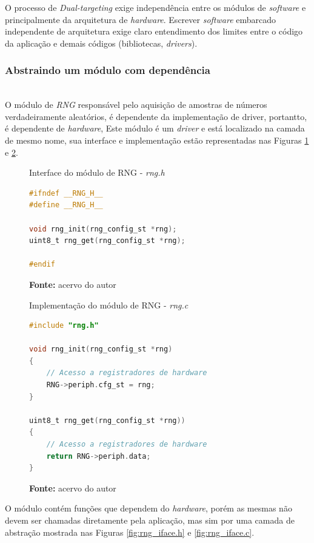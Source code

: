 \documentclass[times, twoside, watermark]{artigo}
\begin{document}
O processo de \textit{Dual-targeting} exige independência
entre os módulos de \textit{software} e principalmente da arquitetura de 
\textit{hardware}.
Escrever \textit{software} embarcado independente de arquitetura exige claro
entendimento dos limites entre o código da aplicação e demais códigos (bibliotecas, 
\textit{drivers}).

\subsubsection{Abstraindo um módulo com dependência}\hfill\\

O módulo de \textit{RNG} responsável pelo aquisição de amostras de números 
verdadeiramente aleatórios, é dependente da implementação de driver,
portantto, é dependente de \textit{hardware}, 
Este módulo é um \textit{driver} e está localizado na camada de mesmo nome, sua 
interface e implementação estão representadas
nas Figuras \ref{fig:rng.h} e \ref{fig:rng.c}.\hfill\

\begin{figure}[H]
  \centering
  \caption{Interface do módulo de RNG - \textit{rng.h}}
\begin{lstlisting}[language=C]
#ifndef __RNG_H__
#define __RNG_H__

void rng_init(rng_config_st *rng);
uint8_t rng_get(rng_config_st *rng);

#endif
\end{lstlisting}
  \label{fig:rng.h}
  \caption*{\newline\textbf{Fonte:} acervo do autor}
\end{figure}


\begin{figure}[H]
  \centering
  \caption{Implementação do módulo de RNG - \textit{rng.c}}
\begin{lstlisting}[language=C]
#include "rng.h"

void rng_init(rng_config_st *rng)
{
    // Acesso a registradores de hardware
    RNG->periph.cfg_st = rng;
}

uint8_t rng_get(rng_config_st *rng))
{
    // Acesso a registradores de hardware
    return RNG->periph.data;
}

\end{lstlisting}
  \label{fig:rng.c}
  \caption*{\newline\textbf{Fonte:} acervo do autor}
\end{figure}

O módulo contém funções que dependem do \textit{hardware}, porém as mesmas não
devem ser chamadas diretamente pela aplicação, mas sim por uma camada de abstração
mostrada nas Figuras \ref{fig:rng_iface.h} e \ref{fig:rng_iface.c}.\hfill\\
\end{document}
